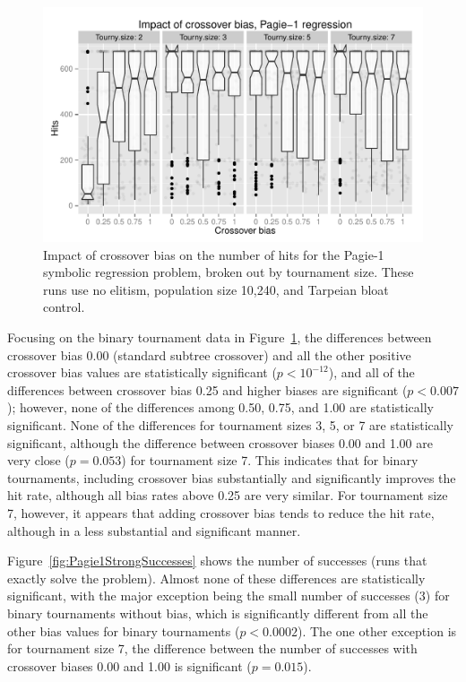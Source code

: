 \documentclass{sig-alternate}
\begin{document}
\begin{figure}[tb]
\centering
\includegraphics[width=0.45 \textwidth]{Plots/Pagie_1_strong_Hits_vs_Bias_Tournys_FunctionSet.pdf}
\caption{Impact of crossover bias on the number of hits for the Pagie-1 symbolic regression problem, 
	broken out by tournament size. These runs use no elitism, 
	population size 10,240, and Tarpeian bloat control.}
\label{fig:Pagie1StrongHits_Bias_Tournys_FunctionSet}
\end{figure}

Focusing on the binary tournament data in Figure~\ref{fig:Pagie1StrongHits_Bias_Tournys_FunctionSet}, the differences
between crossover bias 0.00 (standard subtree crossover) and all the other positive crossover bias values are
statistically significant ($p<10^{-12}$), and all of the differences between crossover bias 0.25 and higher biases are
significant ($p<0.007$); however, none of the differences among 0.50, 0.75, and 1.00 are statistically significant.
None of the differences for tournament sizes 3, 5, or 7 are statistically significant, although the difference between
crossover biases 0.00 and 1.00 are very close ($p=0.053$) for tournament size 7. This indicates that for binary
tournaments, including crossover bias substantially and significantly improves the hit rate, although all bias rates
above 0.25 are very similar. For tournament size 7, however, it appears that adding crossover bias tends to reduce the
hit rate, although in a less substantial and significant manner.

%
%
%
%

Figure~\ref{fig:Pagie1StrongSuccesses} shows the number of successes (runs that exactly solve the problem). Almost none
of these differences are statistically significant, with the major exception being the small number of successes (3)
for binary tournaments without bias, which is significantly different from all the other bias values for binary
tournaments ($p<0.0002$). The one other exception is for tournament size 7, the difference between the number of
successes with crossover biases 0.00 and 1.00 is significant ($p=0.015$).
\end{document}
